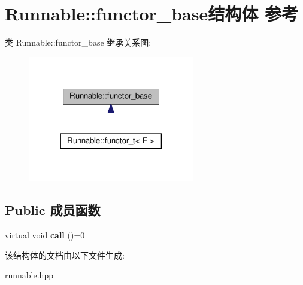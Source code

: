 \hypertarget{structRunnable_1_1functor__base}{}\section{Runnable\+:\+:functor\+\_\+base结构体 参考}
\label{structRunnable_1_1functor__base}


类 Runnable\+:\+:functor\+\_\+base 继承关系图\+:\nopagebreak
\begin{figure}[H]
\begin{center}
\leavevmode
\includegraphics[width=206pt]{structRunnable_1_1functor__base__inherit__graph}
\end{center}
\end{figure}
\subsection*{Public 成员函数}
\begin{DoxyCompactItemize}
\item 
\mbox{\label{structRunnable_1_1functor__base_ab43e3c0a0e9f697ff88ec5f1e3256756}} 
virtual void {\bfseries call} ()=0
\end{DoxyCompactItemize}


该结构体的文档由以下文件生成\+:\begin{DoxyCompactItemize}
\item 
runnable.\+hpp\end{DoxyCompactItemize}
